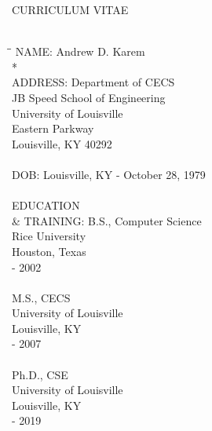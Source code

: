 \documentclass[12pt,dvips]{report}
\numberwithin{equation}{section}
\begin{document}
\begin{center}
CURRICULUM VITAE \\
{ \ } \\
\end{center}
\begin{tabbing}
\hspace{100pt}\=\hspace{100pt}\=\kill
NAME: \> Andrew D. Karem \\*
{ \ } \\
ADDRESS: \> Department of CECS \\
 \> JB Speed School of Engineering \\
 \> University of Louisville \\
  Eastern Parkway \\
 \> Louisville, KY 40292 \\
{ \ } \\
DOB: \> Louisville, KY - October 28, 1979 \\
{ \ } \\
EDUCATION\\
\& TRAINING: \> B.S., Computer Science \\
 \> Rice University \\
 \> Houston, Texas \\
  - 2002 \\ %
{ \ } \\
\> M.S., CECS \\
\> University of Louisville \\
 \> Louisville, KY \\
  - 2007 \\ %
{ \ } \\
\> Ph.D., CSE \\
\> University of Louisville \\
 \> Louisville, KY \\
  - 2019 \\ %
{ \ } \\


\end{tabbing}
\end{document}
